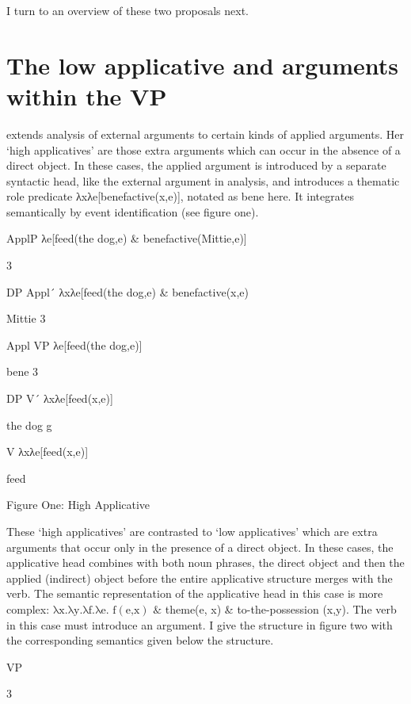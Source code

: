 \documentclass[output=paper,modfonts,nonflat]{langsci/langscibook}
\begin{document}
I turn to an overview of these two proposals next.

\section{The low applicative and arguments within the VP} %

\citet{Pylkkänen2008} extends  analysis of external arguments to certain kinds of applied arguments.  Her ‘high applicatives’ are those extra arguments which can occur in the absence of a direct object.  In these cases, the applied argument is introduced by a separate syntactic head, like the external argument in  analysis, and introduces a thematic role predicate λxλe[benefactive(x,e)], notated as bene here.  It integrates semantically by event identification (see figure one).

        ApplP    λe[feed(the dog,e) \& benefactive(Mittie,e)]

       3       

       DP        Appl´   λxλe[feed(the dog,e) \& benefactive(x,e)

  Mittie   3

    Appl          VP    λe[feed(the dog,e)]

bene    3

DP           V´    λxλe[feed(x,e)]

     the dog           g 

     V    λxλe[feed(x,e)]

   feed

\begin{stylecaption}
Figure One: High Applicative    
\end{stylecaption}

These ‘high applicatives’ are contrasted to ‘low applicatives’ which are extra arguments that occur only in the presence of a direct object.  In these cases, the applicative head combines with both noun phrases, the direct object and then the applied (indirect) object before the entire applicative structure merges with the verb.  The semantic representation of the applicative head in this case is more complex:  $\text{λx.λy.λf.λe}\text{. f}\left(\text{e,x}\right)\text{ \&} $  theme(e, x) \& to-the-possession (x,y).  The verb in this case must introduce an argument.  I give the structure in figure two with the corresponding semantics given below the structure.

        VP

            3  
\end{document}
